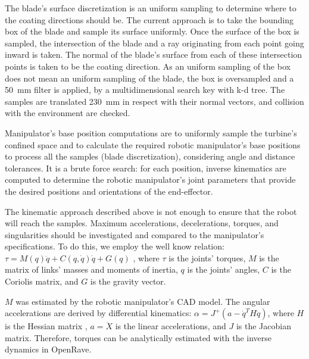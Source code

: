 The blade's surface discretization is an uniform sampling to
determine where to the coating directions should be. The current approach is to
take the bounding box of the blade and sample its surface uniformly. Once the
surface of the box is sampled, the intersection of the blade and a ray
originating from each point going inward is taken. The normal of the blade's
surface from each of these intersection points is taken to be the coating
direction. As an uniform sampling of the box does not mean an uniform sampling
of the blade, the box is oversampled and a 50~mm filter is applied, by a
multidimensional search key with k-d tree. The samples are translated 230~mm in
respect with their normal vectors, and collision with the environment are checked. 

Manipulator's base position computations are to uniformly sample the turbine's
confined space and to calculate the required robotic manipulator's base
positions to process all the samples (blade discretization),  considering angle
and distance tolerances. It is a brute force search: for each position, inverse
kinematics are computed to determine the robotic manipulator's joint parameters that provide
the desired positions and orientations of the end-effector.

The kinematic approach described above is not enough to ensure that the robot
will reach the samples. Maximum accelerations, decelerations,
torques, and singularities should be investigated and compared to the
manipulator's specifications. To do this, we employ the well know relation:
$\tau = M(q)\ddot{q} + C(q,\dot{q})\dot{q} + G(q)$
\cite{sciavicco2000differential}, where $\tau$ is the joints' torques, $M$ is
the matrix of links' masses and moments of inertia, $q$ is the joints' angles,
$C$ is the Coriolis matrix, and $G$ is the gravity vector.

$M$ was estimated by the robotic manipulator's CAD model. The angular
accelerations are derived by differential kinematics:
$\alpha=J^+(a-\dot{q}^TH\dot{q})$, where $H$ is the Hessian matrix
\cite{hourtash2005kinematic}, $a=\ddot{X}$ is the linear accelerations, and $J$
is the Jacobian matrix. Therefore, torques can be analytically estimated with
the inverse dynamics in OpenRave.

